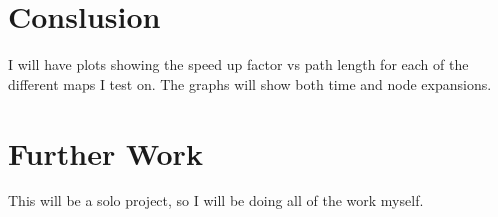 \documentclass[12pt]{article}
\begin{document}
\section{Conslusion}
I will have plots showing the speed up factor vs path length for each of the different maps I test on. The graphs will show both time and node expansions.

\section{Further Work}
This will be a solo project, so I will be doing all of the work myself.



\end{document}
